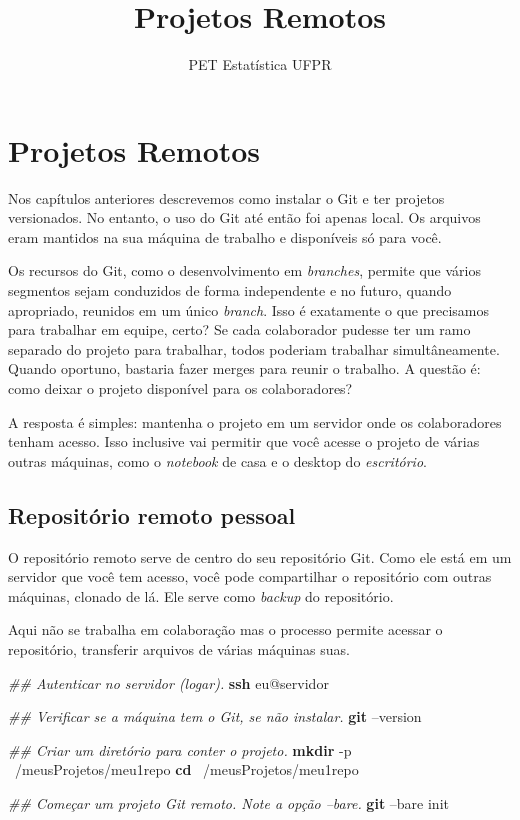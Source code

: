 \documentclass[
  a5paper,
  pagesize,
  9pt,
  pointlessnumbers,
  normalheadings,
  twoside=false
]{book}
\title{Projetos Remotos}
\author{PET Estatística UFPR}
\date{}
\newenvironment{Shaded}{\begin{snugshade}}{\end{snugshade}}
\newcommand{\KeywordTok}[1]{\textcolor[rgb]{0.13,0.29,0.53}{\textbf{{#1}}}}
\newcommand{\CommentTok}[1]{\textcolor[rgb]{0.56,0.35,0.01}{\textit{{#1}}}}
\newcommand{\NormalTok}[1]{{#1}}
\begin{document}
\maketitle


{
\hypersetup{linkcolor=black}
\setcounter{tocdepth}{2}
\tableofcontents
}



\chapter{Projetos Remotos}

Nos capítulos anteriores descrevemos como instalar o Git e ter projetos
versionados. No entanto, o uso do Git até então foi apenas local. Os
arquivos eram mantidos na sua máquina de trabalho e disponíveis só para
você.

Os recursos do Git, como o desenvolvimento em \emph{branches}, permite
que vários segmentos sejam conduzidos de forma independente e no futuro,
quando apropriado, reunidos em um único \emph{branch}. Isso é exatamente
o que precisamos para trabalhar em equipe, certo? Se cada colaborador
pudesse ter um ramo separado do projeto para trabalhar, todos poderiam
trabalhar simultâneamente. Quando oportuno, bastaria fazer merges para
reunir o trabalho. A questão é: como deixar o projeto disponível para os
colaboradores?

A resposta é simples: mantenha o projeto em um servidor onde os
colaboradores tenham acesso. Isso inclusive vai permitir que você acesse
o projeto de várias outras máquinas, como o \emph{notebook} de casa e o
desktop do \emph{escritório}.

\section{Repositório remoto pessoal}\label{repositorio-remoto-pessoal}

O repositório remoto serve de centro do seu repositório Git. Como ele
está em um servidor que você tem acesso, você pode compartilhar o
repositório com outras máquinas, clonado de lá. Ele serve como
\emph{backup} do repositório.

Aqui não se trabalha em colaboração mas o processo permite acessar o
repositório, transferir arquivos de várias máquinas suas.

\begin{Shaded}
\begin{Highlighting}[]
\CommentTok{## Autenticar no servidor (logar).}
\KeywordTok{ssh} \NormalTok{eu@servidor}

\CommentTok{## Verificar se a máquina tem o Git, se não instalar.}
\KeywordTok{git} \NormalTok{--version}

\CommentTok{## Criar um diretório para conter o projeto.}
\KeywordTok{mkdir} \NormalTok{-p ~/meusProjetos/meu1repo}
\KeywordTok{cd} \NormalTok{~/meusProjetos/meu1repo}

\CommentTok{## Começar um projeto Git remoto. Note a opção --bare.}
\KeywordTok{git} \NormalTok{--bare init}
\end{Highlighting}
\end{Shaded}
\end{document}
